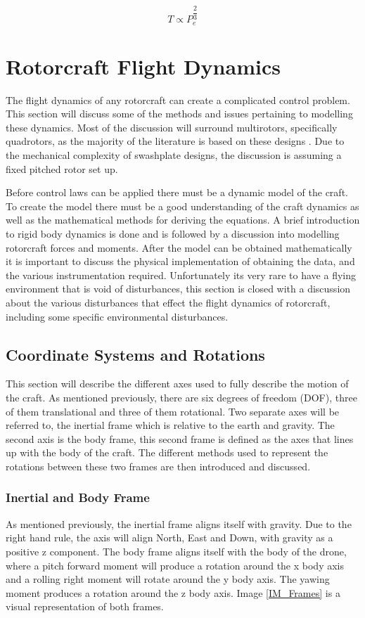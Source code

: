 	\begin{equation*}
	T \propto P_e^{\dfrac{2}{3}}
	\end{equation*}

\section{Rotorcraft Flight Dynamics}

The flight dynamics of any rotorcraft can create a complicated control problem. This section will discuss some of the methods and issues pertaining to modelling these dynamics. Most of the discussion will surround multirotors, specifically quadrotors, as the majority of the literature is based on these designs \cite{Luukkonen, RealTime, Pounds2006, Hoffmann}. Due to the mechanical complexity of swashplate designs, the discussion is assuming a fixed pitched rotor set up. 

Before control laws can be applied there must be a dynamic model of the craft. To create the model there must be a good understanding of the craft dynamics as well as the mathematical methods for deriving the equations. A brief introduction to rigid body dynamics is done and is followed by a discussion into modelling rotorcraft forces and moments. After the model can be obtained mathematically it is important to discuss the physical implementation of obtaining the data, and the various instrumentation required. Unfortunately its very rare to have a flying environment that is void of disturbances, this section is closed with a discussion about the various disturbances that effect the flight dynamics of rotorcraft, including some specific environmental disturbances.

	\subsection{Coordinate Systems and Rotations}
	This section will describe the different axes used to fully describe the motion of the craft. As mentioned previously, there are six degrees of freedom (DOF), three of them translational and three of them rotational. Two separate axes will be referred to, the inertial frame which is relative to the earth and gravity. The second axis is the body frame, this second frame is defined as the axes that lines up with the body of the craft. The different methods used to represent the rotations between these two frames are then introduced and discussed.
	
		\subsubsection{Inertial and Body Frame}
		As mentioned previously, the inertial frame aligns itself with gravity. Due to the right hand rule, the axis will align North, East and Down, with gravity as a positive z component. The body frame aligns itself with the body of the drone, where a pitch forward moment will produce a rotation around the x body axis and a rolling right moment will rotate around the y body axis. The yawing moment produces a rotation around the z body axis. Image \ref{IM_Frames} is a visual representation of both frames.
		
